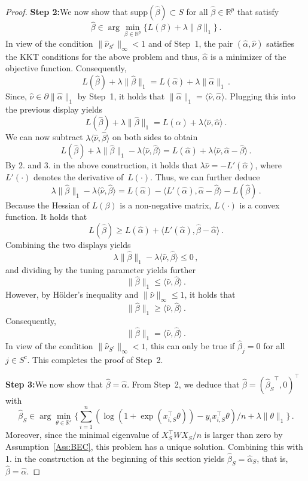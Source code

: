 \documentclass{elsarticle}
\def\T{\top}
\newcommand\norm[1]{\lVert#1\rVert}
\newcommand{\argmin}{\arg\!\min}
\newcommand{\estipara}{{\hat{\beta}}}
\newcommand{\estiparaj}{{\hat{\beta}_j}}
\newcommand{\para}{{\beta}}
\newcommand{\estiparas}{{\hat{\beta}_{S}}}
\newcommand{\tuning}{{\lambda}}
\newcommand{\R}{{\mathbb{R}}}
\newcommand{\primal}{{\hat{\alpha}}}
\newcommand{\prims}{{\hat{\alpha}_{S}}}
\newcommand{\dual}{{\hat{\nu}}}
\newcommand{\dualsc}{{\hat{\nu}_{{S}^c}}}
\newcommand{\deriva}{{W}}
\begin{document}
\begin{proof}
\textbf{Step 2:}\enspace  We now show that \textnormal{supp}$(\estipara)\subset S$ for all $\estipara\in \R^p$ that satisfy
  \[ \estipara\in \argmin_{\beta\in \R^p}\{L(\para)+\tuning\norm{\beta}_1\}\,.\]
 In view of the condition $\norm{\dualsc}_{\infty}<1$ and of Step~1, the pair $(\primal,\dual)$ satisfies the KKT conditions for the above problem and thus, $\primal$ is a minimizer of the objective function. Consequently,
  \[ L(\estipara)+\tuning\norm{\estipara}_1=L(\primal)+\tuning\norm{\primal}_1\,.\]
  Since,  $\dual\in\partial\norm{\primal}_1$ by Step~1, it holds that $\norm{\primal}_1=\langle \dual,\primal\rangle.$ Plugging this into the previous display yields
  \[ L(\estipara)+\tuning\norm{\estipara}_1=L(\primal)+\tuning\langle \dual,\primal\rangle\,.\]
  We can now subtract $\tuning\langle \dual, \estipara\rangle$ on both sides to obtain
  \[ L(\estipara)+\tuning\norm{\estipara}_1-\tuning\langle \dual, \estipara\rangle=L(\primal)+\tuning\langle \dual,\primal-\estipara\rangle\,.\]
  By 2. and 3. in the above construction, it holds that $\tuning\dual=-L'(\primal)$, where $L'(\cdot)$ denotes the derivative  of~$L(\cdot)$.
  Thus, we can further deduce
  \[ \tuning\norm{\estipara}_1-\tuning\langle \dual,\estipara \rangle=L(\primal)-\langle L'(\primal),\primal-\estipara\rangle-L(\estipara)\,.\]
  Because the Hessian of $L(\para)$ is a non-negative matrix, $L(\cdot)$ is a convex function. It holds that
  \[L(\estipara)\geq L(\primal)+\langle L'(\primal),\estipara-\primal\rangle\,.\]
 Combining the two displays yields
  \[ \tuning \norm{\estipara}_1-\tuning\langle \dual, \estipara\rangle\leq 0\,,\]
 and dividing by the tuning parameter yields further
  \[ \norm{\estipara}_1\leq \langle \dual, \estipara\rangle\,.\]
  However, by H\"{o}lder's inequality and $\norm{\dual}_{\infty}\leq 1$, it holds that
  \[ \norm{\estipara}_1\geq \langle \dual,\estipara\rangle\,.\]
  Consequently,
  \[ \norm{\estipara}_1=\langle \dual,\estipara\rangle\,.\]
  In view of the condition $\norm{\dualsc}_{\infty}<1$, this can only be true if $\estiparaj=0$ for all $j\in {S}^c$. This completes the proof of Step~2.

  \textbf{Step 3:}\enspace We now show that $\estipara=\primal$.
  From Step~2, we deduce that $\estipara=(\estiparas^\T,0)^\T$ with
  \[ \estiparas\in \argmin_{\theta\in \R^{s}}\bigg\{\sum_{i=1}^n(\log(1+\exp(x_{i,S}^\T
       \theta))-y_ix_{i,S}^\T \theta)/n+\tuning\norm{\theta}_1\bigg\}\,. \]
  Moreover, since the minimal eigenvalue of $X_{S}^\top\deriva X_{S}/n$ is larger than zero by Assumption~\ref{Ass:BEC}, this problem has a unique solution.  Combining this with 1. in the construction at the beginning of this section yields  $\estiparas=\prims$, that is, $\estipara = \primal$.
\end{proof}
\enspace
\end{document}
